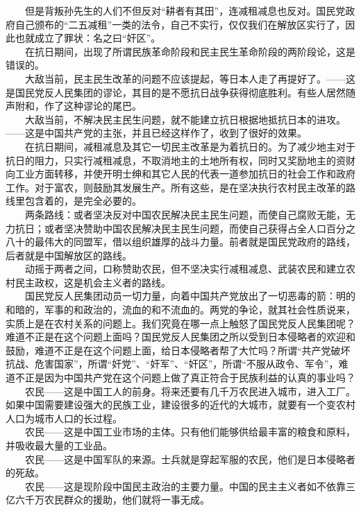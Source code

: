 \documentclass[cn,11pt,chinese]{elegantbook}
\begin{document}
　　但是背叛孙先生的人们不但反对“耕者有其田”，连减租减息也反对。国民党政府自己颁布的“二五减租”一类的法令，自己不实行，仅仅我们在解放区实行了，因此也就成立了罪状：名之曰“奸区”。\\
　　在抗日期间，出现了所谓民族革命阶段和民主民生革命阶段的两阶段论，这是错误的。\\
　　大敌当前，民主民生改革的问题不应该提起，等日本人走了再提好了。——这是国民党反人民集团的谬论，其目的是不愿抗日战争获得彻底胜利。有些人居然随声附和，作了这种谬论的尾巴。\\
　　大敌当前，不解决民主民生问题，就不能建立抗日根据地抵抗日本的进攻。——这是中国共产党的主张，并且已经这样作了，收到了很好的效果。\\
　　在抗日期间，减租减息及其它一切民主改革是为着抗日的。为了减少地主对于抗日的阻力，只实行减租减息，不取消地主的土地所有权，同时又奖励地主的资财向工业方面转移，并使开明士绅和其它人民的代表一道参加抗日的社会工作和政府工作。对于富农，则鼓励其发展生产。所有这些，是在坚决执行农村民主改革的路线里包含着的，是完全必要的。\\
　　两条路线：或者坚决反对中国农民解决民主民生问题，而使自己腐败无能，无力抗日；或者坚决赞助中国农民解决民主民生问题，而使自己获得占全人口百分之八十的最伟大的同盟军，借以组织雄厚的战斗力量。前者就是国民党政府的路线，后者就是中国解放区的路线。\\
　　动摇于两者之间，口称赞助农民，但不坚决实行减租减息、武装农民和建立农村民主政权，这是机会主义者的路线。\\
　　国民党反人民集团动员一切力量，向着中国共产党放出了一切恶毒的箭：明的和暗的，军事的和政治的，流血的和不流血的。两党的争论，就其社会性质说来，实质上是在农村关系的问题上。我们究竟在哪一点上触怒了国民党反人民集团呢？难道不正是在这个问题上面吗？国民党反人民集团之所以受到日本侵略者的欢迎和鼓励，难道不正是在这个问题上面，给日本侵略者帮了大忙吗？所谓“共产党破坏抗战、危害国家”，所谓“奸党”、“奸军”、“奸区”，所谓“不服从政令、军令”，难道不正是因为中国共产党在这个问题上做了真正符合于民族利益的认真的事业吗？\\
　　农民——这是中国工人的前身。将来还要有几千万农民进入城市，进入工厂。如果中国需要建设强大的民族工业，建设很多的近代的大城市，就要有一个变农村人口为城市人口的长过程。\\
　　农民——这是中国工业市场的主体。只有他们能够供给最丰富的粮食和原料，并吸收最大量的工业品。\\
　　农民——这是中国军队的来源。士兵就是穿起军服的农民，他们是日本侵略者的死敌。\\
　　农民——这是现阶段中国民主政治的主要力量。中国的民主主义者如不依靠三亿六千万农民群众的援助，他们就将一事无成。\\
\end{document}
